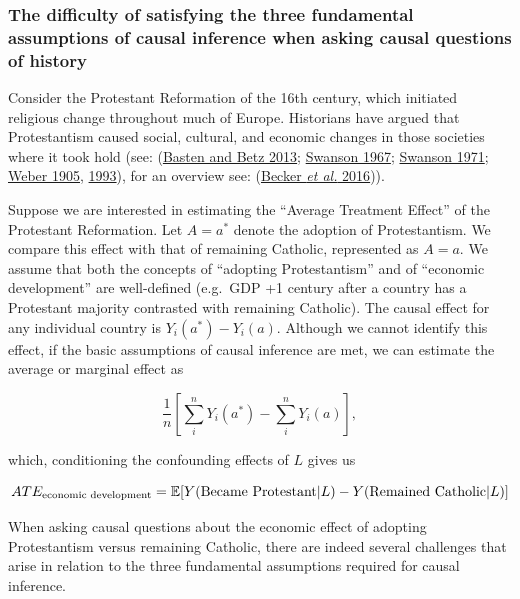 \documentclass[
  singlecolumn]{article}
\begin{document}
\hypertarget{the-difficulty-of-satisfying-the-three-fundamental-assumptions-of-causal-inference-when-asking-causal-questions-of-history}{%
\subsubsection{The difficulty of satisfying the three fundamental
assumptions of causal inference when asking causal questions of
history}\label{the-difficulty-of-satisfying-the-three-fundamental-assumptions-of-causal-inference-when-asking-causal-questions-of-history}}

Consider the Protestant Reformation of the 16th century, which initiated
religious change throughout much of Europe. Historians have argued that
Protestantism caused social, cultural, and economic changes in those
societies where it took hold (see:
(\protect\hyperlink{ref-basten2013}{Basten and Betz 2013};
\protect\hyperlink{ref-swanson1967}{Swanson 1967};
\protect\hyperlink{ref-swanson1971}{Swanson 1971};
\protect\hyperlink{ref-weber1905}{Weber 1905},
\protect\hyperlink{ref-weber1993}{1993}), for an overview see:
(\protect\hyperlink{ref-becker2016}{Becker \emph{et al.} 2016})).

Suppose we are interested in estimating the ``Average Treatment Effect''
of the Protestant Reformation. Let \(A = a^*\) denote the adoption of
Protestantism. We compare this effect with that of remaining Catholic,
represented as \(A = a\). We assume that both the concepts of ``adopting
Protestantism'' and of ``economic development'' are well-defined
(e.g.~GDP +1 century after a country has a Protestant majority
contrasted with remaining Catholic). The causal effect for any
individual country is \(Y_i(a^*) - Y_i(a)\). Although we cannot identify
this effect, if the basic assumptions of causal inference are met, we
can estimate the average or marginal effect as

\[\frac{1}{n} \left[\sum_i^{n} Y_i(a^*) - \sum_i^{n} Y_i(a)\right],\]

which, conditioning the confounding effects of \(L\) gives us

\[ATE_{\textnormal{economic~development}} = \mathbb{E}[Y(\textnormal{Became~Protestant}|L) - Y(\textnormal{Remained~Catholic}|L)]\]

When asking causal questions about the economic effect of adopting
Protestantism versus remaining Catholic, there are indeed several
challenges that arise in relation to the three fundamental assumptions
required for causal inference.
\end{document}

